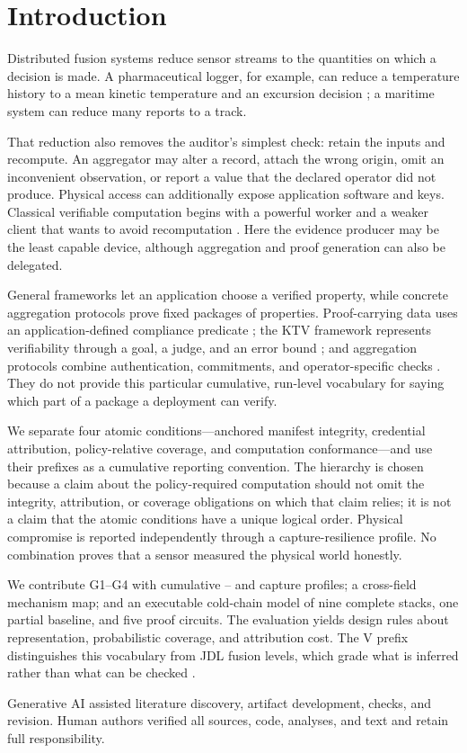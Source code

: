 \section{Introduction}
\label{sec:intro}

Distributed fusion systems reduce sensor streams to the quantities on which a
decision is made. A pharmaceutical logger, for example, can reduce a
temperature history to a mean kinetic temperature and an excursion decision
\cite{usp2023mkt}; a maritime system can reduce many reports to
a track.

That reduction also removes the auditor's simplest check: retain the inputs and
recompute. An aggregator may alter a record, attach the wrong origin, omit an
inconvenient observation, or report a value that the declared operator did not
produce. Physical access can additionally expose application software and
keys. Classical verifiable computation begins with a powerful worker and a
weaker client that wants to avoid recomputation \cite{gennaro2010}. Here the
evidence producer may be the least capable device, although aggregation and
proof generation can also be delegated.

General frameworks let an application choose a verified property, while
concrete aggregation protocols prove fixed packages of properties.
Proof-carrying data uses an application-defined compliance predicate
\cite{chiesa2010pcd}; the KTV framework represents verifiability through a goal,
a judge, and an error bound \cite{cortier2016}; and aggregation protocols combine
authentication, commitments, and operator-specific checks
\cite{przydatek2003sia,palazzo2024mpvas,zhou2024ppvda}. They do not provide this
particular cumulative, run-level vocabulary for saying which part of a package
a deployment can verify.

We separate four atomic conditions---anchored manifest integrity, credential
attribution, policy-relative coverage, and computation conformance---and use
their prefixes as a cumulative reporting convention. The hierarchy is chosen
because a claim about the policy-required computation should not omit the
integrity, attribution, or coverage obligations on which that claim relies; it
is not a claim that the atomic conditions have a unique logical order. Physical
compromise is reported independently through a capture-resilience profile. No
combination proves that a sensor measured the physical world honestly.

We contribute G1--G4 with cumulative \Vzero--\Vfour{} and capture profiles; a
cross-field mechanism map; and an executable cold-chain model of nine complete
stacks, one partial baseline, and five proof circuits. The evaluation yields
design rules about representation, probabilistic coverage, and attribution
cost. The V prefix distinguishes this vocabulary from JDL fusion levels, which
grade what is inferred rather than what can be checked \cite{steinberg1999jdl}.

Generative AI assisted literature discovery, artifact development, checks, and
revision. Human authors verified all sources, code, analyses, and text and
retain full responsibility.\par

